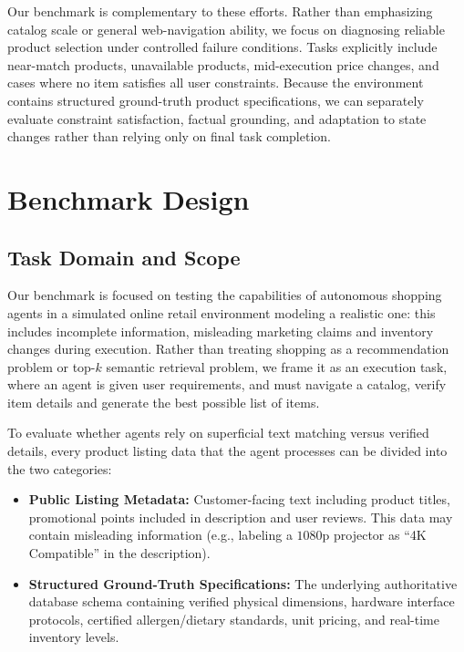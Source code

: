 \documentclass{article} %
\begin{document}
Our benchmark is complementary to these efforts. Rather than emphasizing catalog scale or general web-navigation ability, we focus on diagnosing reliable product selection under controlled failure conditions. Tasks explicitly include near-match products, unavailable products, mid-execution price changes, and cases where no item satisfies all user constraints. Because the environment contains structured ground-truth product specifications, we can separately evaluate constraint satisfaction, factual grounding, and adaptation to state changes rather than relying only on final task completion.


\section{Benchmark Design}
\label{sec:benchmark_design}

\subsection{Task Domain and Scope} %
Our benchmark is focused on testing the capabilities of autonomous shopping agents in a simulated online retail environment modeling a realistic one: this includes incomplete information, misleading marketing claims and inventory changes during execution. Rather than treating shopping as a recommendation problem or top-$k$ semantic retrieval problem, we frame it as an execution task, where an agent is given user requirements, and must navigate a catalog, verify item details and generate the best possible list of items.

 To evaluate whether agents rely on superficial text matching versus verified details, every product listing data that the agent processes can be divided into the two categories:
\begin{itemize}[leftmargin=*,noitemsep,topsep=0pt]
    \item \textbf{Public Listing Metadata:} Customer-facing text including product titles, promotional points included in description and user reviews. This data may contain misleading information (e.g., labeling a $1080\text{p}$ projector as ``4K Compatible'' in the description).
    \item \textbf{Structured Ground-Truth Specifications:} The underlying authoritative database schema containing verified physical dimensions, hardware interface protocols, certified allergen/dietary standards, unit pricing, and real-time inventory levels.

\end{itemize}
\end{document}
